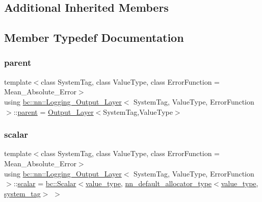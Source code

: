 \subsection*{Additional Inherited Members}


\subsection{Member Typedef Documentation}
\mbox{\label{structbc_1_1nn_1_1Logging__Output__Layer_a877dc26708c5c343e59500647b73db36}} 
\subsubsection{\texorpdfstring{parent}{parent}}
{\footnotesize\ttfamily template$<$class System\+Tag, class Value\+Type, class Error\+Function = Mean\+\_\+\+Absolute\+\_\+\+Error$>$ \\
using \hyperlink{structbc_1_1nn_1_1Logging__Output__Layer}{bc\+::nn\+::\+Logging\+\_\+\+Output\+\_\+\+Layer}$<$ System\+Tag, Value\+Type, Error\+Function $>$\+::\hyperlink{structbc_1_1nn_1_1Logging__Output__Layer_a877dc26708c5c343e59500647b73db36}{parent} =  \hyperlink{structbc_1_1nn_1_1Output__Layer}{Output\+\_\+\+Layer}$<$System\+Tag,Value\+Type$>$}

\mbox{\label{structbc_1_1nn_1_1Logging__Output__Layer_a4830f722f2588645f63804b804fe3879}} 
\subsubsection{\texorpdfstring{scalar}{scalar}}
{\footnotesize\ttfamily template$<$class System\+Tag, class Value\+Type, class Error\+Function = Mean\+\_\+\+Absolute\+\_\+\+Error$>$ \\
using \hyperlink{structbc_1_1nn_1_1Logging__Output__Layer}{bc\+::nn\+::\+Logging\+\_\+\+Output\+\_\+\+Layer}$<$ System\+Tag, Value\+Type, Error\+Function $>$\+::\hyperlink{structbc_1_1nn_1_1Logging__Output__Layer_a4830f722f2588645f63804b804fe3879}{scalar} =  \hyperlink{namespacebc_aa12ac55ee2c43dc082894dd3859daee1}{bc\+::\+Scalar}$<$\hyperlink{structbc_1_1nn_1_1Logging__Output__Layer_afc35d7b8c1f7d2f514a99a16845155ef}{value\+\_\+type}, \hyperlink{namespacebc_1_1nn_a0025752fc3f47f988b3fae106c825860}{nn\+\_\+default\+\_\+allocator\+\_\+type}$<$\hyperlink{structbc_1_1nn_1_1Logging__Output__Layer_afc35d7b8c1f7d2f514a99a16845155ef}{value\+\_\+type}, \hyperlink{structbc_1_1nn_1_1Logging__Output__Layer_abeeff813d295dfb5d7b764a41c6ce557}{system\+\_\+tag}$>$ $>$}

